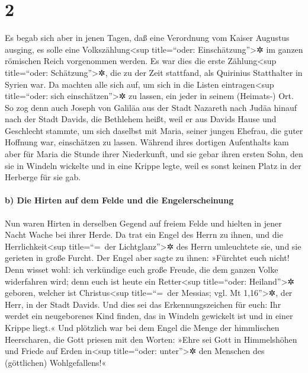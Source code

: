 \hypertarget{section-1}{%
\section{2}\label{section-1}}

 Es begab sich aber in jenen Tagen, daß eine Verordnung
vom Kaiser Augustus ausging, es solle eine Volkszählung\textless sup
title=``oder: Einschätzung''\textgreater✲ im ganzen römischen Reich
vorgenommen werden.  Es war dies die erste
Zählung\textless sup title=``oder: Schätzung''\textgreater✲, die zu der
Zeit stattfand, als Quirinius Statthalter in Syrien war. 
Da machten alle sich auf, um sich in die Listen eintragen\textless sup
title=``oder: sich einschätzen''\textgreater✲ zu lassen, ein jeder in
seinem (Heimats-) Ort.  So zog denn auch Joseph von
Galiläa aus der Stadt Nazareth nach Judäa hinauf nach der Stadt Davids,
die Bethlehem heißt, weil er aus Davids Hause und Geschlecht stammte,
 um sich daselbst mit Maria, seiner jungen Ehefrau, die
guter Hoffnung war, einschätzen zu lassen.  Während ihres
dortigen Aufenthalts kam aber für Maria die Stunde ihrer Niederkunft,
 und sie gebar ihren ersten Sohn, den sie in Windeln
wickelte und in eine Krippe legte, weil es sonst keinen Platz in der
Herberge für sie gab.

\hypertarget{b-die-hirten-auf-dem-felde-und-die-engelerscheinung}{%
\paragraph{b) Die Hirten auf dem Felde und die
Engelerscheinung}\label{b-die-hirten-auf-dem-felde-und-die-engelerscheinung}}

 Nun waren Hirten in derselben Gegend auf freiem Felde und
hielten in jener Nacht Wache bei ihrer Herde.  Da trat ein
Engel des Herrn zu ihnen, und die Herrlichkeit\textless sup
title=``=~der Lichtglanz''\textgreater✲ des Herrn umleuchtete sie, und
sie gerieten in große Furcht.  Der Engel aber sagte zu
ihnen: »Fürchtet euch nicht! Denn wisset wohl: ich verkündige euch große
Freude, die dem ganzen Volke widerfahren wird;  denn euch
ist heute ein Retter\textless sup title=``oder: Heiland''\textgreater✲
geboren, welcher ist Christus\textless sup title=``=~der Messias; vgl.
Mt 1,16''\textgreater✲, der Herr, in der Stadt Davids. 
Und dies sei das Erkennungszeichen für euch: Ihr werdet ein neugeborenes
Kind finden, das in Windeln gewickelt ist und in einer Krippe liegt.«
 Und plötzlich war bei dem Engel die Menge der
himmlischen Heerscharen, die Gott priesen mit den Worten:
 »Ehre sei Gott in Himmelshöhen und Friede auf Erden
in\textless sup title=``oder: unter''\textgreater✲ den Menschen des
(göttlichen) Wohlgefallens!«

